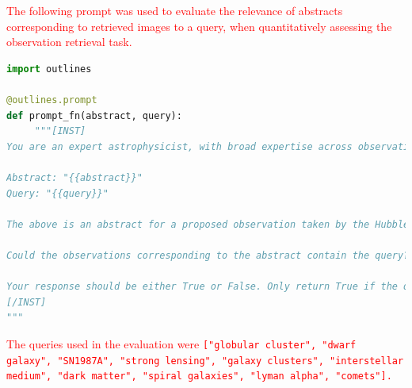 \documentclass{article} %
\newcommand{\changes}[1]{\textcolor{red}{#1}}
\begin{document}
\changes{The following prompt was used to evaluate the relevance of abstracts corresponding to retrieved images to a query, when quantitatively assessing the observation retrieval task.}

\begin{lstlisting}[language=Python]
import outlines

@outlines.prompt
def prompt_fn(abstract, query):
     """[INST]
You are an expert astrophysicist, with broad expertise across observational and theoretical astrophysics.

Abstract: "{{abstract}}"
Query: "{{query}}"

The above is an abstract for a proposed observation taken by the Hubble Space Telescope (labeled "Abstract"), and an object or concept (labeled "Query").

Could the observations corresponding to the abstract contain the query? Be precise, and do not contain related concepts or objects. 

Your response should be either True or False. Only return True if the query is closely related to the abstract, and the downstream observation could be relevant to the query.
[/INST]
"""
\end{lstlisting}

\changes{The queries used in the evaluation were \texttt{["globular cluster", "dwarf galaxy", "SN1987A", "strong lensing", "galaxy clusters", "interstellar medium", "dark matter", "spiral galaxies", "lyman alpha", "comets"].}}



\end{document}
